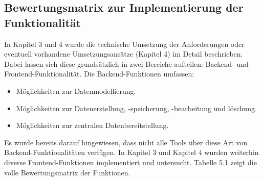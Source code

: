 \subsection{Bewertungsmatrix zur Implementierung der Funktionalität}
In Kapitel 3 und 4 wurde die technische Umsetzung der Anforderungen oder eventuell vorhandene Umsetzungsansätze (Kapitel 4) im Detail beschrieben.    Dabei lassen sich diese grundsätzlich in zwei Bereiche aufteilen: Backend- und Frontend-Funktionalität. 
Die Backend-Funktionen umfassen:
\begin{itemize}[noitemsep]
\item Möglichkeiten zur Datenmodellierung.
\item Möglichkeiten zur Datenerstellung, -speicherung, -bearbeitung und löschung.
\item Möglichkeiten zur zentralen Datenbereitstellung.
\end{itemize}
Es wurde bereits darauf hingewiesen, dass nicht alle Tools über diese Art von Backend-Funktionalitäten verfügen.
In Kapitel 3 und Kapitel 4 wurden weiterhin diverse Frontend-Funktionen implementiert und untersucht. Tabelle 5.1 zeigt die volle Bewertungsmatrix der Funktionen.

